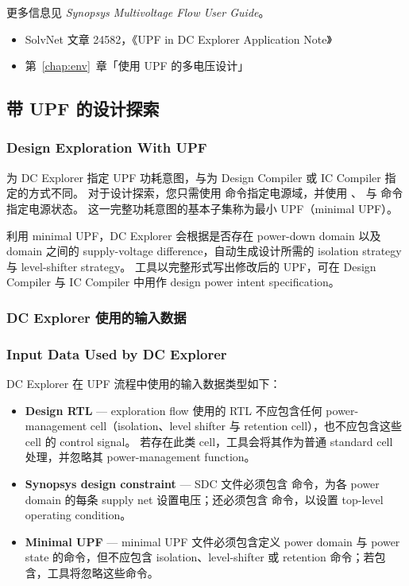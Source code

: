 更多信息见 \textit{Synopsys Multivoltage Flow User Guide}。

\begin{seeAlsoBox}
\begin{itemize}
  \item SolvNet 文章 24582，《UPF in DC Explorer Application Note》
  \item 第~\ref{chap:env}~章「使用 UPF 的多电压设计」
\end{itemize}
\end{seeAlsoBox}

\subsection{带 UPF 的设计探索}
\subsubsection*{Design Exploration With UPF}

为 DC Explorer 指定 UPF 功耗意图，与为 Design Compiler 或 IC Compiler 指定的方式不同。
对于设计探索，您只需使用  命令指定电源域，并使用 、 与  命令指定电源状态。
这一完整功耗意图的基本子集称为最小 UPF（minimal UPF）。

利用 minimal UPF，DC Explorer 会根据是否存在 power-down domain 以及 domain 之间的 supply-voltage difference，自动生成设计所需的 isolation strategy 与 level-shifter strategy。
工具以完整形式写出修改后的 UPF，可在 Design Compiler 与 IC Compiler 中用作 design power intent specification。

\subsubsection{DC Explorer 使用的输入数据}
\subsubsection*{Input Data Used by DC Explorer}

DC Explorer 在 UPF 流程中使用的输入数据类型如下：
\begin{itemize}
  \item \textbf{Design RTL} — exploration flow 使用的 RTL 不应包含任何 power-management cell（isolation、level shifter 与 retention cell），也不应包含这些 cell 的 control signal。
        若存在此类 cell，工具会将其作为普通 standard cell 处理，并忽略其 power-management function。
  \item \textbf{Synopsys design constraint} — SDC 文件必须包含  命令，为各 power domain 的每条 supply net 设置电压；还必须包含  命令，以设置 top-level operating condition。
  \item \textbf{Minimal UPF} — minimal UPF 文件必须包含定义 power domain 与 power state 的命令，但不应包含 isolation、level-shifter 或 retention 命令；若包含，工具将忽略这些命令。
\end{itemize}

